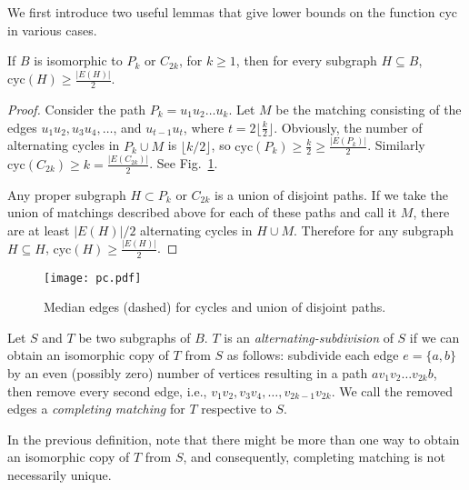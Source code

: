 \documentclass[10pt]{llncs}
\begin{document}
We first introduce two useful lemmas that give lower bounds on the
function $\text{cyc}$ in various cases.

\begin{lemma}\label{subpc}
  If $B$ is isomorphic to $P_k$ or $C_{2k}$, for $k\geq 1$, then for
  every subgraph $H \subseteq B$, $\text{cyc}(H) \geq
  \frac{|E(H)|}{2}$.
\end{lemma}

\begin{proof}
  Consider the path $P_k = u_1u_2\ldots u_k$. Let $M$ be the matching
  consisting of the edges $u_1u_2, u_3u_4,\ldots$, and $u_{t-1}u_t$,
  where $t = 2\lfloor \frac{k}{2} \rfloor$. Obviously, the number of
  alternating cycles in $P_k \cup M$ is $\lfloor k/2 \rfloor$, so
  $\text{cyc}(P_k) \geq \frac{k}{2} \geq \frac{|E(P_k)|}{2}$.
  Similarly $\text{cyc}(C_{2k}) \geq k = \frac{|E(C_{2k})|}{2}$.  See
  Fig.~\ref{pc}.

  Any proper subgraph $H \subset P_k$ or $C_{2k}$ is a union of
  disjoint paths. If we take the union of matchings described above
  for each of these paths and call it $M$, there are at least
  $|E(H)|/2$ alternating cycles in $H \cup M$. Therefore for any
  subgraph $H \subseteq H$, $\text{cyc}(H) \geq
  \frac{|E(H)|}{2}$. \end{proof}

\begin{figure}[h]{
    \begin{center}
      \texttt{[image: pc.pdf]}
      \caption{Median edges (dashed) for cycles and union of disjoint paths.}
      \label{pc}
    \end{center}
}\end{figure}

\begin{definition}
  Let $S$ and $T$ be two subgraphs of $B$. $T$ is an {\em
    alternating-subdivision} of $S$ if we can obtain an isomorphic
  copy of $T$ from $S$ as follows: subdivide each edge $e = \{a, b\}$
  by an even (possibly zero) number of vertices resulting in a path
  $av_1v_2\ldots v_{2k}b$, then remove every second edge, i.e.,
  $v_1v_2, v_3v_4, \ldots, v_{2k-1}v_{2k}$. We call the removed edges
  a {\em completing matching} for $T$ respective to $S$.
\end{definition}

In the previous definition, note that there might be more than one way
to obtain an isomorphic copy of $T$ from $S$, and consequently,
completing matching is not necessarily unique.
\end{document}
